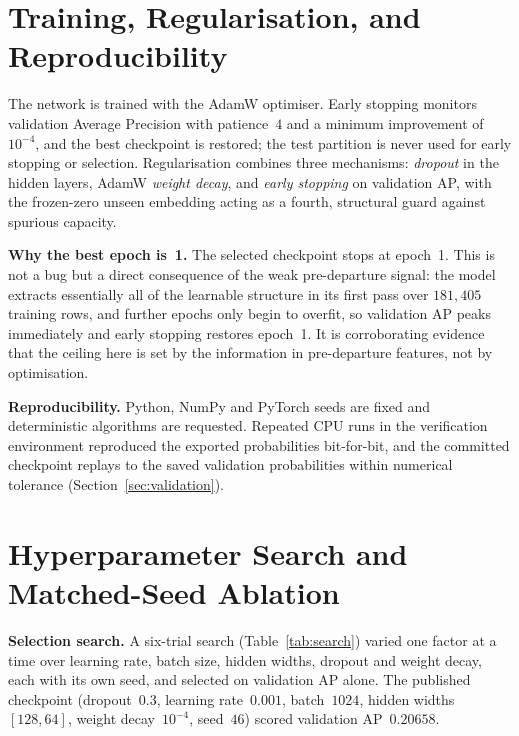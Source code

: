 \documentclass[conference]{IEEEtran}
\begin{document}
\section{Training, Regularisation, and Reproducibility}
\label{sec:training}
The network is trained with the AdamW optimiser. Early stopping monitors
validation Average Precision with patience~$4$ and a minimum improvement of
$10^{-4}$, and the best checkpoint is restored; the test partition is never used
for early stopping or selection. Regularisation combines three mechanisms:
\emph{dropout} in the hidden layers, AdamW \emph{weight decay}, and
\emph{early stopping} on validation AP, with the frozen-zero unseen embedding
acting as a fourth, structural guard against spurious capacity.

\textbf{Why the best epoch is~1.}
The selected checkpoint stops at epoch~1. This is not a bug but a direct
consequence of the weak pre-departure signal: the model extracts essentially all
of the learnable structure in its first pass over $181{,}405$ training rows, and
further epochs only begin to overfit, so validation AP peaks immediately and
early stopping restores epoch~1. It is corroborating evidence that the ceiling
here is set by the information in pre-departure features, not by optimisation.

\textbf{Reproducibility.}
Python, NumPy and PyTorch seeds are fixed and deterministic algorithms are
requested. Repeated CPU runs in the verification environment reproduced the
exported probabilities bit-for-bit, and the committed checkpoint replays to the
saved validation probabilities within numerical tolerance
(Section~\ref{sec:validation}).

\section{Hyperparameter Search and Matched-Seed Ablation}
\label{sec:ablation}
\textbf{Selection search.}
A six-trial search (Table~\ref{tab:search}) varied one factor at a time over
learning rate, batch size, hidden widths, dropout and weight decay, each with its
own seed, and selected on validation AP alone. The published checkpoint
(dropout~$0.3$, learning rate~$0.001$, batch~$1024$, hidden widths $[128,64]$,
weight decay~$10^{-4}$, seed~$46$) scored validation AP~$0.20658$.
\end{document}
